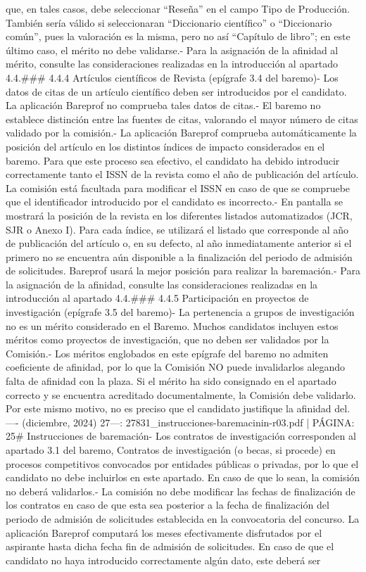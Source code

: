 \documentclass{article}
\begin{document}
\begin{itemize}
{{{{{que, en tales casos, debe seleccionar “Reseña” en el campo Tipo de Producción. También sería válido si seleccionaran “Diccionario científico” o “Diccionario común”, pues la valoración es la misma, pero no así “Capítulo de libro”; en este último caso, el mérito no debe validarse.\n- Para la asignación de la afinidad al mérito, consulte las consideraciones realizadas en la introducción al apartado 4.4.\n\n### 4.4.4 Artículos científicos de Revista (epígrafe 3.4 del baremo)\n\n- Los datos de citas de un artículo científico deben ser introducidos por el candidato. La aplicación Bareprof no comprueba tales datos de citas.\n- El baremo no establece distinción entre las fuentes de citas, valorando el mayor número de citas validado por la comisión.\n- La aplicación Bareprof comprueba automáticamente la posición del artículo en los distintos índices de impacto considerados en el baremo. Para que este proceso sea efectivo, el candidato ha debido introducir correctamente tanto el ISSN de la revista como el año de publicación del artículo. La comisión está facultada para modificar el ISSN en caso de que se compruebe que el identificador introducido por el candidato es incorrecto.\n- En pantalla se mostrará la posición de la revista en los diferentes listados automatizados (JCR, SJR o Anexo I). Para cada índice, se utilizará el listado que corresponde al año de publicación del artículo o, en su defecto, al año inmediatamente anterior si el primero no se encuentra aún disponible a la finalización del periodo de admisión de solicitudes. Bareprof usará la mejor posición para realizar la baremación.\n- Para la asignación de la afinidad, consulte las consideraciones realizadas en la introducción al apartado 4.4.\n\n### 4.4.5 Participación en proyectos de investigación (epígrafe 3.5 del baremo)\n\n- La pertenencia a grupos de investigación no es un mérito considerado en el Baremo. Muchos candidatos incluyen estos méritos como proyectos de investigación, que no deben ser validados por la Comisión.\n- Los méritos englobados en este epígrafe del baremo no admiten coeficiente de afinidad, por lo que la Comisión NO puede invalidarlos alegando falta de afinidad con la plaza. Si el mérito ha sido consignado en el apartado correcto y se encuentra acreditado documentalmente, la Comisión debe validarlo. Por este mismo motivo, no es preciso que el candidato justifique la afinidad del.\n\n----\n{} (diciembre, 2024) 27\n\n---\n\nFUENTE: 27831_instrucciones-baremacinin-r03.pdf | PÁGINA: 25\n# Instrucciones de baremación\n\n- Los contratos de investigación corresponden al apartado 3.1 del baremo, Contratos de investigación (o becas, si procede) en procesos competitivos convocados por entidades públicas o privadas, por lo que el candidato no debe incluirlos en este apartado. En caso de que lo sean, la comisión no deberá validarlos.\n- La comisión no debe modificar las fechas de finalización de los contratos en caso de que esta sea posterior a la fecha de finalización del periodo de admisión de solicitudes establecida en la convocatoria del concurso. La aplicación Bareprof computará los meses efectivamente disfrutados por el aspirante hasta dicha fecha fin de admisión de solicitudes. En caso de que el candidato no haya introducido correctamente algún dato, este deberá ser }}}}}
\end{itemize}
\end{document}
